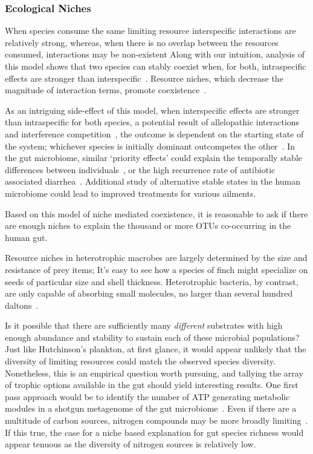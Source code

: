 \documentclass[12pt]{article}
\begin{document}
\subsubsection{Ecological Niches}
When species consume the same limiting resource
interspecific interactions are relatively strong,
whereas, when there is no overlap between the resources consumed,
interactions may be non-existent
Along with our intuition, analysis of this model shows that
two species can stably coexist when, for both,
intraspecific effects are stronger than interspecific~\citep{TODO}.
Resource niches,
which decrease the magnitude of interaction terms,
promote coexistence~\citep{TODO}.

As an intriguing side-effect of this model,
when interspecific effects are stronger than intraspecific for both
species,
a potential result of allelopathic interactions and
interference competition~\citep{Folt1981},
the outcome is dependent on the starting state of
the system;
whichever species is initially dominant outcompetes the other~\citep{TODO}.
In the gut microbiome, similar `priority effects' could explain the
temporally stable differences between
individuals~\citep{Dethlefsen2006,Lahti2014},
or the high recurrence rate of antibiotic associated diarrhea~\citep{TODO}.
Additional study of alternative stable states in the human
microbiome could lead to improved treatments for various ailments.

Based on this model of niche mediated coexistence,
it is reasonable to ask if there are enough niches
to explain the thousand or more OTUs co-occurring in the human gut.

Resource niches in heterotrophic macrobes are largely
determined by the size and resistance of prey items;
It's easy to see how a species of finch might specialize on
seeds of particular size and shell thickness.
Heterotrophic bacteria, by contrast, are only capable of
absorbing small molecules,
no larger than several hundred daltons~\citep{TODO}.

Is it possible that there are sufficiently many \emph{different}
substrates with high enough abundance and stability
to sustain each of these microbial populations?
Just like Hutchinson's plankton,
at first glance, it would appear unlikely that the diversity
of limiting resources could match the observed species
diversity.
Nonetheless, this is an empirical question worth pursuing,
and tallying the array of trophic options available in the gut
should yield interesting results.
One first pass approach would be to identify the number of
ATP generating metabolic modules in a shotgun metagenome
of the gut microbiome~\citep{TODO}.
Even if there are a multitude of carbon sources,
nitrogen compounds may be more broadly limiting~\citep{TODO}.
If this true, the case for a niche based explanation for
gut species richness would appear tenuous
as the diversity of nitrogen sources is relatively low.
\end{document}
